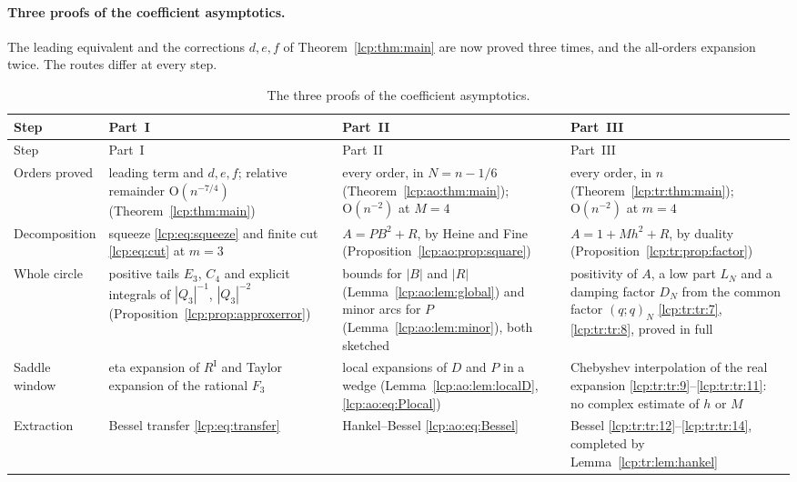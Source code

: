 \documentclass[11pt]{article}
\numberwithin{equation}{section}
\theoremstyle{definition}\newtheorem{definition}[theorem]{Definition}
\theoremstyle{remark}\newtheorem{remark}[theorem]{Remark}
\newcommand{\OO}{\mathrm O}
\begin{document}
\paragraph{Three proofs of the coefficient asymptotics.} The leading
equivalent and the corrections $d,e,f$ of Theorem~\ref{lcp:thm:main} are
now proved three times, and the all-orders expansion twice. The routes
differ at every step.

{\small
\begin{longtable}{@{}>{\raggedright}p{}>{\raggedright}p{}>{\raggedright}p{}>{\raggedright\arraybackslash}p{}@{}}
\caption{The three proofs of the coefficient asymptotics.}\label{lcp:tr:tab:proofs}\\
\toprule
Step & Part~I & Part~II & Part~III\\
\midrule
\endfirsthead
\toprule
Step & Part~I & Part~II & Part~III\\
\midrule
\endhead
\bottomrule
\endfoot
Orders proved & leading term and $d,e,f$; relative remainder $\OO(n^{-7/4})$ (Theorem~\ref{lcp:thm:main}) & every order, in $N=n-1/6$ (Theorem~\ref{lcp:ao:thm:main}); $\OO(n^{-2})$ at $M=4$ & every order, in $n$ (Theorem~\ref{lcp:tr:thm:main}); $\OO(n^{-2})$ at $m=4$\\
Decomposition & squeeze \eqref{lcp:eq:squeeze} and finite cut \eqref{lcp:eq:cut} at $m=3$ & $A=PB^2+R$, by Heine and Fine (Proposition~\ref{lcp:ao:prop:square}) & $A=1+Mh^2+R$, by duality (Proposition~\ref{lcp:tr:prop:factor})\\
Whole circle & positive tails $E_3$, $C_4$ and explicit integrals of $|Q_3|^{-1}$, $|Q_3|^{-2}$ (Proposition~\ref{lcp:prop:approxerror}) & bounds for $|B|$ and $|R|$ (Lemma~\ref{lcp:ao:lem:global}) and minor arcs for $P$ (Lemma~\ref{lcp:ao:lem:minor}), both sketched & positivity of $A$, a low part $L_N$ and a damping factor $D_N$ from the common factor $(q;q)_N$ \eqref{lcp:tr:tr:7}, \eqref{lcp:tr:tr:8}, proved in full\\
Saddle window & eta expansion of $R^{\mathrm I}$ and Taylor expansion of the rational $F_3$ & local expansions of $D$ and $P$ in a wedge (Lemma~\ref{lcp:ao:lem:localD}, \eqref{lcp:ao:eq:Plocal}) & Chebyshev interpolation of the real expansion \eqref{lcp:tr:tr:9}--\eqref{lcp:tr:tr:11}: no complex estimate of $h$ or $M$\\
Extraction & Bessel transfer \eqref{lcp:eq:transfer} & Hankel--Bessel \eqref{lcp:ao:eq:Bessel} & Bessel \eqref{lcp:tr:tr:12}--\eqref{lcp:tr:tr:14}, completed by Lemma~\ref{lcp:tr:lem:hankel}\\
\end{longtable}}
\end{document}

